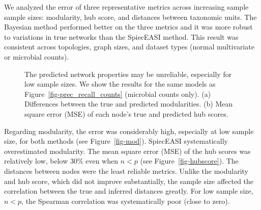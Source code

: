 \documentclass[
  a4paper,
]{article}
\begin{document}
We analyzed the error of three representative metrics across increasing
sample sample sizes: modularity, hub score, and distances between
taxonomic units. The Bayesian method performed better on the three
metrics and it was more robust to variations in true networks than the
SpiecEASI method. This result was consistent across topologies, graph
sizes, and dataset types (normal multivariate or microbial counts).

\begin{figure}

\begin{minipage}[t]{\linewidth}

{\centering 


}

\subcaption{\label{fig-mod}}
\end{minipage}%
\newline
\begin{minipage}[t]{\linewidth}

{\centering 


}

\subcaption{\label{fig-hubscore}}
\end{minipage}%

\caption{\label{fig-regression}The predicted network properties may be
unreliable, especially for low sample sizes. We show the results for the
same models as Figure~\ref{fig-prec_recall_counts} (microbial counts
only). (a) Differences between the true and predicted modularities. (b)
Mean square error (MSE) of each node's true and predicted hub scores.}

\end{figure}

Regarding modularity, the error was considerably high, especially at low
sample size, for both methods (see Figure~\ref{fig-mod}). SpiecEASI
systematically overestimated modularity. The mean square error (MSE) of
the hub scores was relatively low, below 30\% even when \(n<p\) (see
Figure~\ref{fig-hubscore}). The distances between nodes were the least
reliable metrics. Unlike the modularity and hub score, which did not
improve substantially, the sample size affected the correlation between
the true and inferred distances greatly. For low sample size, \(n<p\),
the Spearman correlation was systematically poor (close to zero).
\end{document}
